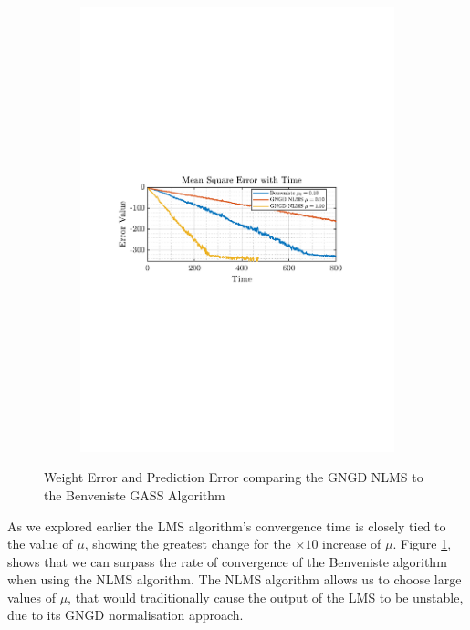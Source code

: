 \documentclass[12pt]{article}
\numberwithin{equation}{section}
\begin{document}
\begin{figure}[H]
\begin{subfigure}{0.49\textwidth}
					\includegraphics[trim={2.2cm 11.2cm 3.15cm  11.2cm}, clip, width=\textwidth]{../MATLAB/figures/q2_2c_fig04.pdf} 
					\captionsetup{justification=centering}
				\end{subfigure}
				\captionsetup{justification=centering}
				\caption{Weight Error and Prediction Error comparing the GNGD NLMS to the Benveniste GASS Algorithm}
				\label{fig: 2-2c}
			\end{figure}
		
			As we explored earlier the LMS algorithm's convergence time is closely tied to the value of $\mu$, showing the greatest change for the $\times10$ increase of $\mu$. Figure \ref{fig: 2-2c}, shows that we can surpass the rate of convergence of the Benveniste algorithm when using the NLMS algorithm. The NLMS algorithm allows us to choose large values of $\mu$, that would traditionally cause the output of the LMS to be unstable, due to its GNGD normalisation approach.
			
\end{document}
